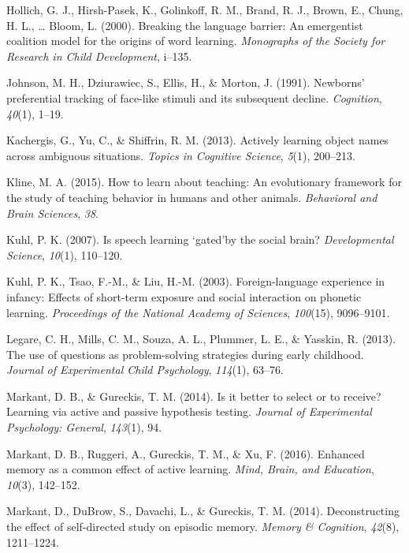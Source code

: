 \documentclass[a4paper,man,apacite,floatsintext]{apa6}
\begin{document}
\hypertarget{ref-hollich2000breaking}{}
Hollich, G. J., Hirsh-Pasek, K., Golinkoff, R. M., Brand, R. J., Brown,
E., Chung, H. L., \ldots{} Bloom, L. (2000). Breaking the language
barrier: An emergentist coalition model for the origins of word
learning. \emph{Monographs of the Society for Research in Child
Development}, i--135.

\hypertarget{ref-johnson1991newborns}{}
Johnson, M. H., Dziurawiec, S., Ellis, H., \& Morton, J. (1991).
Newborns' preferential tracking of face-like stimuli and its subsequent
decline. \emph{Cognition}, \emph{40}(1), 1--19.

\hypertarget{ref-kachergis2013actively}{}
Kachergis, G., Yu, C., \& Shiffrin, R. M. (2013). Actively learning
object names across ambiguous situations. \emph{Topics in Cognitive
Science}, \emph{5}(1), 200--213.

\hypertarget{ref-kline2015learn}{}
Kline, M. A. (2015). How to learn about teaching: An evolutionary
framework for the study of teaching behavior in humans and other
animals. \emph{Behavioral and Brain Sciences}, \emph{38}.

\hypertarget{ref-kuhl2007speech}{}
Kuhl, P. K. (2007). Is speech learning `gated'by the social brain?
\emph{Developmental Science}, \emph{10}(1), 110--120.

\hypertarget{ref-kuhl2003foreign}{}
Kuhl, P. K., Tsao, F.-M., \& Liu, H.-M. (2003). Foreign-language
experience in infancy: Effects of short-term exposure and social
interaction on phonetic learning. \emph{Proceedings of the National
Academy of Sciences}, \emph{100}(15), 9096--9101.

\hypertarget{ref-legare2013use}{}
Legare, C. H., Mills, C. M., Souza, A. L., Plummer, L. E., \& Yasskin,
R. (2013). The use of questions as problem-solving strategies during
early childhood. \emph{Journal of Experimental Child Psychology},
\emph{114}(1), 63--76.

\hypertarget{ref-markant2014better}{}
Markant, D. B., \& Gureckis, T. M. (2014). Is it better to select or to
receive? Learning via active and passive hypothesis testing.
\emph{Journal of Experimental Psychology: General}, \emph{143}(1), 94.

\hypertarget{ref-markant2016enhanced}{}
Markant, D. B., Ruggeri, A., Gureckis, T. M., \& Xu, F. (2016). Enhanced
memory as a common effect of active learning. \emph{Mind, Brain, and
Education}, \emph{10}(3), 142--152.

\hypertarget{ref-markant2014deconstructing}{}
Markant, D., DuBrow, S., Davachi, L., \& Gureckis, T. M. (2014).
Deconstructing the effect of self-directed study on episodic memory.
\emph{Memory \& Cognition}, \emph{42}(8), 1211--1224.
\end{document}

